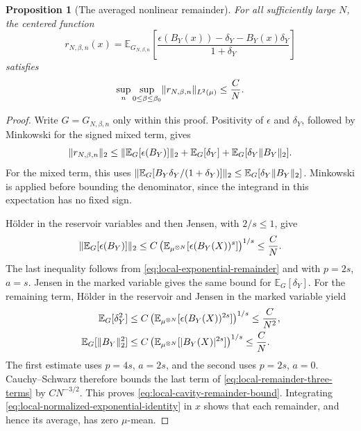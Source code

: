 \documentclass[11pt,reqno]{amsart}
\numberwithin{equation}{section}
\theoremstyle{plain}
\newtheorem{prop}[prop]{Proposition}
\theoremstyle{definition}
\DeclarePairedDelimiter{\norm}{\lVert}{\rVert}
\newcommand{\E}{\mathbb E}
\newcommand{\be}{\beta}
\begin{document}
\begin{prop}[The averaged nonlinear remainder]
\label{prop:local-cavity-remainder}
For all sufficiently large $N$, the centered function
\begin{equation}
 r_{N,\be,n}(x)=\E_{G_{N,\be,n}}\!\left[
 \frac{\epsilon(B_Y(x))-\delta_Y-B_Y(x)\delta_Y}{1+\delta_Y}\right]
 \label{eq:local-cavity-remainder-definition}
\end{equation}
satisfies
\begin{equation}
 \sup_n\sup_{0\leq\be\leq\be_0}
 \norm{r_{N,\be,n}}_{L^2(\mu)}\leq\frac{C}{N}.
 \label{eq:local-cavity-remainder-bound}
\end{equation}
\end{prop}
\begin{proof}
Write $G=G_{N,\be,n}$ only within this proof. Positivity of $\epsilon$ and $\delta_Y$, followed by Minkowski for the signed mixed term, gives
\begin{equation}
 \norm{r_{N,\be,n}}_2
 \leq\norm{\E_G[\epsilon(B_Y)]}_2+\E_G[\delta_Y]
     +\E_G[\delta_Y\norm{B_Y}_2].
 \label{eq:local-remainder-three-terms}
\end{equation}
For the mixed term, this uses
$\norm{\E_G[B_Y\delta_Y/(1+\delta_Y)]}_2
\leq\E_G[\delta_Y\norm{B_Y}_2]$.
Minkowski is applied before bounding the denominator, since the integrand in this expectation has no fixed sign.

H\"older in the reservoir variables and then Jensen, with $2/s\leq1$, give
\begin{equation}
 \norm{\E_G[\epsilon(B_Y)]}_2
 \leq C\left(\E_{\mu^{\otimes N}}[\epsilon(B_Y(X))^s]\right)^{1/s}
 \leq\frac{C}{N}.
 \label{eq:local-remainder-first-term}
\end{equation}
The last inequality follows from \eqref{eq:local-exponential-remainder} and  with $p=2s$, $a=s$. Jensen in the marked variable gives the same bound for $\E_G[\delta_Y]$. For the remaining term, H\"older in the reservoir and Jensen in the marked variable yield
\begin{align}
 \E_G[\delta_Y^2]
 &\leq C\left(\E_{\mu^{\otimes N}}[\epsilon(B_Y(X))^{2s}]\right)^{1/s}
 \leq\frac{C}{N^2},
 \label{eq:local-remainder-delta-second}\\
 \E_G[\norm{B_Y}_2^2]
 &\leq C\left(\E_{\mu^{\otimes N}}[|B_Y(X)|^{2s}]\right)^{1/s}
 \leq\frac{C}{N}.
 \label{eq:local-remainder-field-second}
\end{align}
The first estimate uses $p=4s$, $a=2s$, and the second uses $p=2s$, $a=0$. Cauchy--Schwarz therefore bounds the last term of \eqref{eq:local-remainder-three-terms} by $CN^{-3/2}$. This proves \eqref{eq:local-cavity-remainder-bound}. Integrating \eqref{eq:local-normalized-exponential-identity} in $x$ shows that each remainder, and hence its average, has zero $\mu$-mean.
\end{proof}
\end{document}

